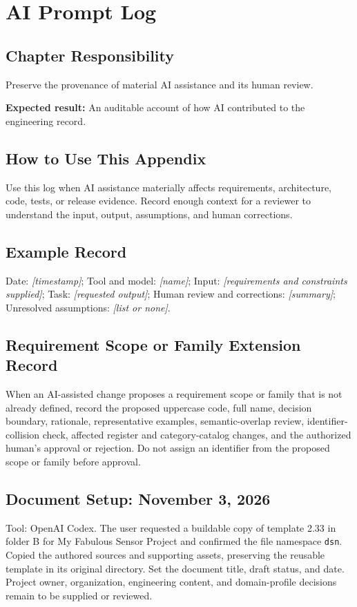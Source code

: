 \chapter{AI Prompt Log}
\section{Chapter Responsibility}
\label{Section:AIPromptLogResponsibility}
Preserve the provenance of material AI assistance and its human review.

\noindent\textbf{Expected result:} An auditable account of how AI contributed to the engineering record.

\section{How to Use This Appendix}
Use this log when AI assistance materially affects requirements, architecture, code, tests, or release evidence. Record enough context for a reviewer to understand the input, output, assumptions, and human corrections.
\section{Example Record}
Date: \textit{[timestamp]}; Tool and model: \textit{[name]}; Input: \textit{[requirements and constraints supplied]}; Task: \textit{[requested output]}; Human review and corrections: \textit{[summary]}; Unresolved assumptions: \textit{[list or none]}.

\section{Requirement Scope or Family Extension Record}
When an AI-assisted change proposes a requirement scope or family that is not
already defined, record the proposed uppercase code, full name, decision
boundary, rationale, representative examples, semantic-overlap review,
identifier-collision check, affected register and category-catalog changes, and
the authorized human's approval or rejection. Do not assign an identifier from
the proposed scope or family before approval.

\section{Document Setup: November 3, 2026}
Tool: OpenAI Codex. The user requested a buildable copy of template 2.33 in
folder B for My Fabulous Sensor Project and confirmed the file namespace
\texttt{dsn}. Copied the authored sources and supporting assets, preserving
the reusable template in its original directory. Set the document title,
draft status, and date. Project owner, organization, engineering content,
and domain-profile decisions remain to be supplied or reviewed.
